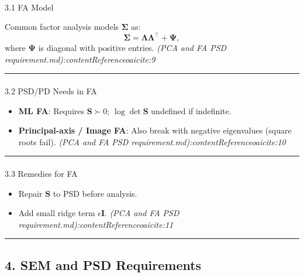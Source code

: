 \documentclass[
  letterpaper,
  DIV=11,
  numbers=noendperiod]{scrartcl}
\makeatletter
\let\oldparagraph\paragraph
\renewcommand{\paragraph}{
    \@ifstar
      \xxxParagraphStar
      \xxxParagraphNoStar
  }
\newcommand{\xxxParagraphStar}[1]{\oldparagraph*{#1}\mbox{}}
\newcommand{\xxxParagraphNoStar}[1]{\oldparagraph{#1}\mbox{}}
\providecommand{\tightlist}{%
  \setlength{\itemsep}{0pt}\setlength{\parskip}{0pt}}
\theoremstyle{remark}
\makeatother
\begin{document}
\paragraph{3.1 FA Model}\label{fa-model}

Common factor analysis models \(\boldsymbol\Sigma\) as: \[
\boldsymbol\Sigma = \boldsymbol\Lambda \boldsymbol\Lambda^\top + \boldsymbol\Psi,
\] where \(\boldsymbol\Psi\) is diagonal with positive entries.
\emph{(PCA and FA PSD requirement.md):contentReference{oaicite:9}}

\begin{center}\rule{0.5\linewidth}{0.5pt}\end{center}

\paragraph{3.2 PSD/PD Needs in FA}\label{psdpd-needs-in-fa}

\begin{itemize}
\tightlist
\item
  \textbf{ML FA}: Requires \(\mathbf{S} \succ 0\);
  \(\log \det \mathbf{S}\) undefined if indefinite.
\item
  \textbf{Principal-axis / Image FA}: Also break with negative
  eigenvalues (square roots fail). \emph{(PCA and FA PSD
  requirement.md):contentReference{oaicite:10}}
\end{itemize}

\begin{center}\rule{0.5\linewidth}{0.5pt}\end{center}

\paragraph{3.3 Remedies for FA}\label{remedies-for-fa}

\begin{itemize}
\tightlist
\item
  Repair \(\mathbf{S}\) to PSD before analysis.
\item
  Add small ridge term \(\epsilon \mathbf{I}\). \emph{(PCA and FA PSD
  requirement.md):contentReference{oaicite:11}}
\end{itemize}

\begin{center}\rule{0.5\linewidth}{0.5pt}\end{center}

\subsection{4. SEM and PSD Requirements}\label{sem-and-psd-requirements}
\end{document}
